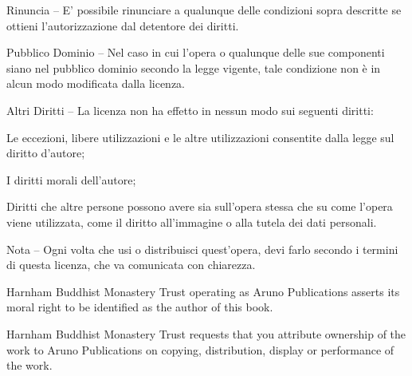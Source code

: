 {\begin{packeditemize}
\item Rinuncia -- E' possibile rinunciare a qualunque delle condizioni sopra descritte se ottieni l'autorizzazione dal detentore dei diritti.
\item Pubblico Dominio -- Nel caso in cui l'opera o qualunque delle sue componenti siano nel pubblico dominio secondo la legge vigente, tale condizione non è in alcun modo modificata dalla licenza.
\item Altri Diritti -- La licenza non ha effetto in nessun modo sui seguenti diritti:
\begin{packeditemize}
\item Le eccezioni, libere utilizzazioni e le altre utilizzazioni consentite dalla legge sul diritto d'autore;
\item I diritti morali dell'autore;
\item Diritti che altre persone possono avere sia sull'opera stessa che su come l'opera viene utilizzata, come il diritto all'immagine o alla tutela dei dati personali.
\end{packeditemize}
\item Nota -- Ogni volta che usi o distribuisci quest'opera, devi farlo secondo i termini di questa licenza, che va comunicata con chiarezza.
\end{packeditemize}

Harnham Buddhist Monastery Trust operating as Aruno Publications asserts its moral right to be identified as the author of this book.

Harnham Buddhist Monastery Trust requests that you attribute ownership of the work to Aruno Publications on copying, distribution, display or performance of the work.

}
